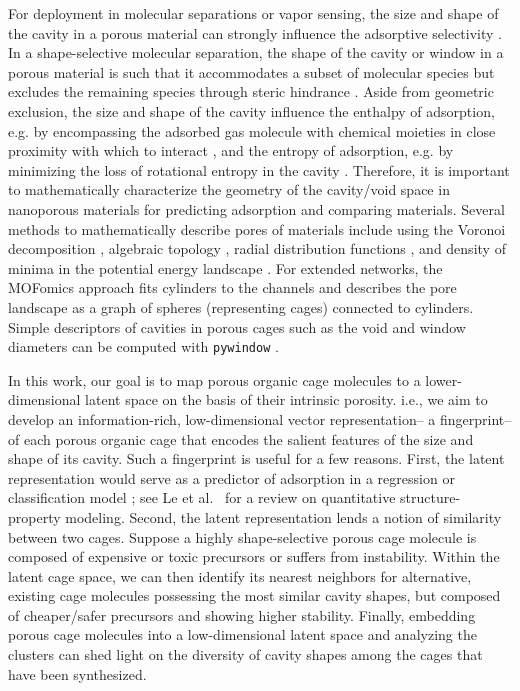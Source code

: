 \documentclass[journal=jacsat,manuscript=article,layout=traditional]{achemso}
\begin{document}
For deployment in molecular separations or vapor sensing, the size and shape of the cavity in a porous material can strongly influence the adsorptive selectivity \cite{mitra2013molecular,zhu1999shape,lee2018high,smit2008towards,sikora2012thermodynamic}. In a shape-selective molecular separation, the shape of the cavity or window in a porous material is such that it accommodates a subset of molecular species but excludes the remaining species through steric hindrance \cite{smit2008towards}. Aside from geometric exclusion, the size and shape of the cavity influence the enthalpy of adsorption, e.g. by encompassing the adsorbed gas molecule with chemical moieties in close proximity with which to interact \cite{simon2015best}, and the entropy of adsorption, e.g. by minimizing the loss of rotational entropy in the cavity \cite{denayer2005rotational}. Therefore, it is important to mathematically characterize the geometry of the cavity/void space in nanoporous materials for predicting adsorption and comparing materials. Several methods to mathematically describe pores of materials include using the Voronoi decomposition \cite{pinheiro2013characterization,martin2011addressing}, algebraic topology \cite{lee2017quantifying}, radial distribution functions \cite{fernandez2013atomic}, and density of minima in the potential energy landscape \cite{oganov2009quantify}. For extended networks, the MOFomics \cite{first2013mofomics} approach fits cylinders to the channels and describes the pore landscape as a graph of spheres (representing cages) connected to cylinders. Simple descriptors of cavities in porous cages such as the void and window diameters can be computed with \texttt{pywindow} \cite{miklitz2018pywindow}.

In this work, our goal is to map porous organic cage molecules to a lower-dimensional latent space on the basis of their intrinsic porosity. i.e., we aim to develop an information-rich, low-dimensional vector representation-- a fingerprint-- of each porous organic cage that encodes the salient features of the size and shape of its cavity. Such a fingerprint is useful for a few reasons. First, the latent representation would serve as a predictor of adsorption in a regression or classification model \cite{friedman2001elements}; see Le et al.~\cite{le2012quantitative} for a review on quantitative structure-property modeling. Second, the latent representation lends a notion of similarity between two cages. Suppose a highly shape-selective porous cage molecule is composed of expensive or toxic precursors or suffers from instability. Within the latent cage space, we can then identify its nearest neighbors for alternative, existing cage molecules possessing the most similar cavity shapes, but composed of cheaper/safer precursors and showing higher stability. Finally, embedding porous cage molecules into a low-dimensional latent space and analyzing the clusters can shed light on the diversity of  cavity shapes among the cages that have been synthesized.
\end{document}
